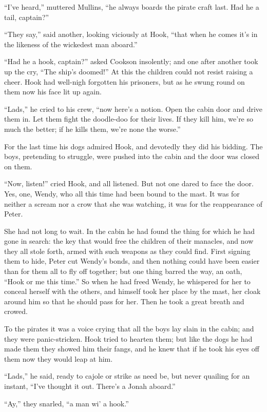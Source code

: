 ``I've heard,'' muttered Mullins, ``he always boards the pirate craft
last. Had he a tail, captain?''

``They say,'' said another, looking viciously at Hook, ``that when he
comes it's in the likeness of the wickedest man aboard.''

``Had he a hook, captain?'' asked Cookson insolently; and one after
another took up the cry, ``The ship's doomed!'' At this the children
could not resist raising a cheer. Hook had well-nigh forgotten his
prisoners, but as he swung round on them now his face lit up again.

``Lads,'' he cried to his crew, ``now here's a notion. Open the cabin door
and drive them in. Let them fight the doodle-doo for their lives. If
they kill him, we're so much the better; if he kills them, we're none
the worse.''

For the last time his dogs admired Hook, and devotedly they did his
bidding. The boys, pretending to struggle, were pushed into the cabin
and the door was closed on them.

``Now, listen!'' cried Hook, and all listened. But not one dared to face
the door. Yes, one, Wendy, who all this time had been bound to the
mast. It was for neither a scream nor a crow that she was watching, it
was for the reappearance of Peter.

She had not long to wait. In the cabin he had found the thing for which
he had gone in search: the key that would free the children of their
manacles, and now they all stole forth, armed with such weapons as they
could find. First signing them to hide, Peter cut Wendy's bonds, and
then nothing could have been easier than for them all to fly off
together; but one thing barred the way, an oath, ``Hook or me this
time.'' So when he had freed Wendy, he whispered for her to conceal
herself with the others, and himself took her place by the mast, her
cloak around him so that he should pass for her. Then he took a great
breath and crowed.

To the pirates it was a voice crying that all the boys lay slain in the
cabin; and they were panic-stricken. Hook tried to hearten them; but
like the dogs he had made them they showed him their fangs, and he knew
that if he took his eyes off them now they would leap at him.

``Lads,'' he said, ready to cajole or strike as need be, but never
quailing for an instant, ``I've thought it out. There's a Jonah aboard.''

``Ay,'' they snarled, ``a man wi' a hook.''

